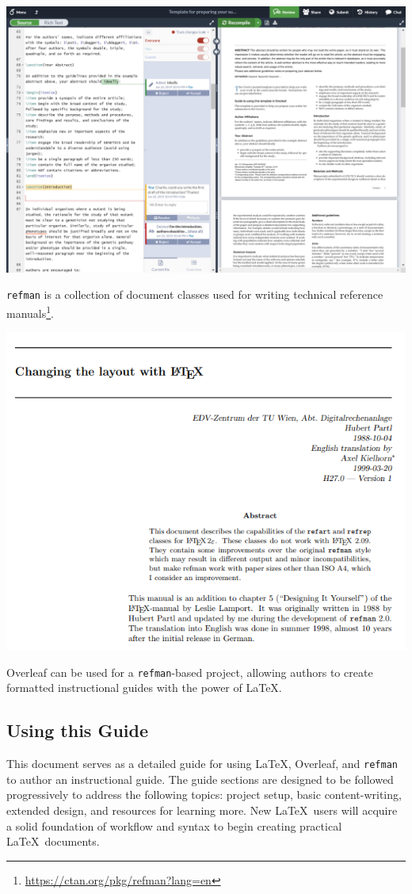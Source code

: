 \begingroup
{}
\endgroup
\includegraphics[width=\linewidth]{graphics/OverleafProduct.png}
\par


\newpage
\texttt{refman} is a collection of document classes used for writing technical reference manuals\footnote{\url{https://ctan.org/pkg/refman?lang=en}}.

\begingroup
{}
\endgroup
\includegraphics[width=\linewidth]{graphics/refman.PNG}

Overleaf can be used for a \texttt{refman}-based project, allowing authors to create formatted instructional guides with the power of \LaTeX.

\newpage
\subsection{Using this Guide}
This document serves as a detailed guide for using \LaTeX, Overleaf, and \texttt{refman} to author an instructional guide. The guide sections are designed to be followed progressively to address the following topics: project setup, basic content-writing, extended design, and resources for learning more. New \LaTeX\ users will acquire a solid foundation of workflow and syntax to begin creating practical \LaTeX\ documents.